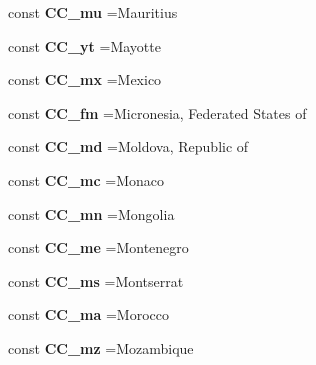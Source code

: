 \begin{DoxyCompactItemize}
const {\bfseries C\+C\+\_\+mu} =\textquotesingle{}Mauritius\textquotesingle{}
\item 
\hypertarget{class_i_s_o_afca4dd4f252bd3c079c6558fe1bc55c6}{}\label{class_i_s_o_afca4dd4f252bd3c079c6558fe1bc55c6} 
const {\bfseries C\+C\+\_\+yt} =\textquotesingle{}Mayotte\textquotesingle{}
\item 
\hypertarget{class_i_s_o_a69022b013cae3934f26e713eea8d554a}{}\label{class_i_s_o_a69022b013cae3934f26e713eea8d554a} 
const {\bfseries C\+C\+\_\+mx} =\textquotesingle{}Mexico\textquotesingle{}
\item 
\hypertarget{class_i_s_o_aac179780f3abb35546ae4e9df63f39e1}{}\label{class_i_s_o_aac179780f3abb35546ae4e9df63f39e1} 
const {\bfseries C\+C\+\_\+fm} =\textquotesingle{}Micronesia, Federated States of\textquotesingle{}
\item 
\hypertarget{class_i_s_o_a5417e60721510e262669cd5eea4c2b43}{}\label{class_i_s_o_a5417e60721510e262669cd5eea4c2b43} 
const {\bfseries C\+C\+\_\+md} =\textquotesingle{}Moldova, Republic of\textquotesingle{}
\item 
\hypertarget{class_i_s_o_aef4b1d5b7b1b4111a390977fba09ecfe}{}\label{class_i_s_o_aef4b1d5b7b1b4111a390977fba09ecfe} 
const {\bfseries C\+C\+\_\+mc} =\textquotesingle{}Monaco\textquotesingle{}
\item 
\hypertarget{class_i_s_o_ac73075ec869f9ac5e5f969dbe35cb506}{}\label{class_i_s_o_ac73075ec869f9ac5e5f969dbe35cb506} 
const {\bfseries C\+C\+\_\+mn} =\textquotesingle{}Mongolia\textquotesingle{}
\item 
\hypertarget{class_i_s_o_a38d95235850cfe9148a6ce3a2f1a8e37}{}\label{class_i_s_o_a38d95235850cfe9148a6ce3a2f1a8e37} 
const {\bfseries C\+C\+\_\+me} =\textquotesingle{}Montenegro\textquotesingle{}
\item 
\hypertarget{class_i_s_o_ae4a11944d105c4bb0a5695abbff41176}{}\label{class_i_s_o_ae4a11944d105c4bb0a5695abbff41176} 
const {\bfseries C\+C\+\_\+ms} =\textquotesingle{}Montserrat\textquotesingle{}
\item 
\hypertarget{class_i_s_o_a99062c51fd0128c813b70390b586a005}{}\label{class_i_s_o_a99062c51fd0128c813b70390b586a005} 
const {\bfseries C\+C\+\_\+ma} =\textquotesingle{}Morocco\textquotesingle{}
\item 
\hypertarget{class_i_s_o_a86f29e47ba943dde883d98e820a4b7c0}{}\label{class_i_s_o_a86f29e47ba943dde883d98e820a4b7c0} 
const {\bfseries C\+C\+\_\+mz} =\textquotesingle{}Mozambique\textquotesingle{}
\item 
\hypertarget{class_i_s_o_a54ddbe7d6b1193e86e6601ef0a12f95e}{}\label{class_i_s_o_a54ddbe7d6b1193e86e6601ef0a12f95e} 

\end{DoxyCompactItemize}
